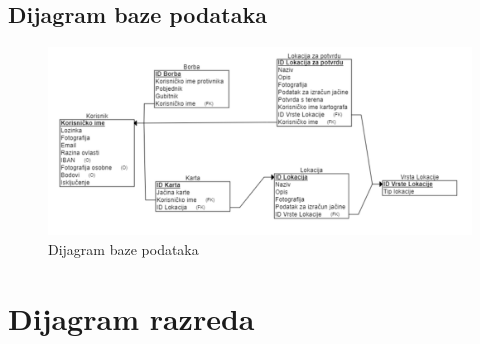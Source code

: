 				
			
			\subsection{Dijagram baze podataka}
				
				\begin{figure}[H]
					\includegraphics[width=\textwidth]{slike/Baza.PNG} %
					\centering
					\caption{Dijagram baze podataka}
					\label{fig:promjene}
				\end{figure}
			
			\eject
			
			
		\section{Dijagram razreda}
		
			
			

